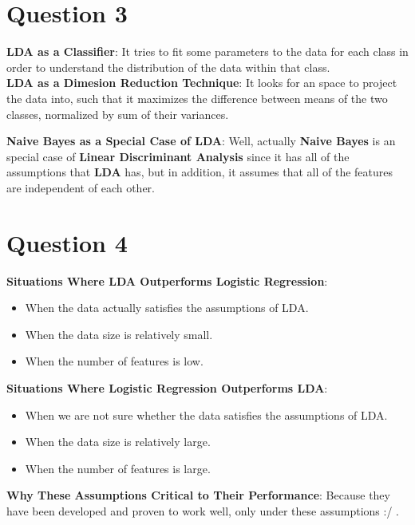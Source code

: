 \documentclass[a4paper,12pt]{article}
\begin{document}
\section*{Question 3}

\noindent\textbf{LDA as a Classifier}:
It tries to fit some parameters to the data for each class in order to understand the distribution of the data within that class. \\

\noindent\textbf{LDA as a Dimesion Reduction Technique}:
It looks for an space to project the data into, such that it maximizes the difference between means of the two classes, normalized by sum of their variances.

\noindent\textbf{Naive Bayes as a Special Case of LDA}:
Well, actually \textbf{Naive Bayes} is an special case of \textbf{Linear Discriminant Analysis} since it has all of the assumptions that \textbf{LDA} has, but in addition, it assumes that all of the 
features are independent of each other. 

\section*{Question 4}
\noindent\textbf{Situations Where LDA Outperforms Logistic Regression}: 
\begin{itemize}
    \item When the data actually satisfies the assumptions of LDA.
    \item When the data size is relatively small.
    \item When the number of features is low.
\end{itemize}

\noindent\textbf{Situations Where Logistic Regression Outperforms LDA}: 
\begin{itemize}
    \item When we are not sure whether the data satisfies the assumptions of LDA.
    \item When the data size is relatively large.
    \item When the number of features is large.
\end{itemize}

\noindent\textbf{Why These Assumptions Critical to Their Performance}:
Because they have been developed and proven to work well, only under these assumptions :/ .
\end{document}
